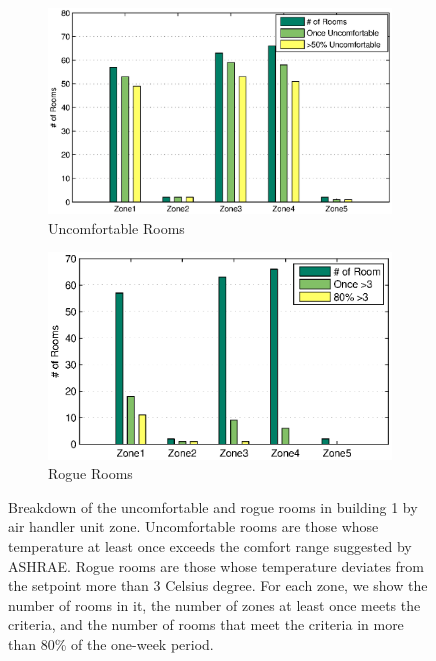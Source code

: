 \begin{figure}[h!]
\centering
	\begin{subfigure}{0.48\textwidth}
                \centering
		\includegraphics[width=\textwidth]{./figs/uncmft_soda.eps}
                \caption{Uncomfortable Rooms}
                \label{fig:soda_zone1}
	\end{subfigure}
	\begin{subfigure}{0.48\textwidth}
                \centering
		\includegraphics[width=\textwidth]{./figs/rogue_soda.eps}
                \caption{Rogue Rooms}
                \label{fig:soda_zone2}

	\end{subfigure}
\caption{Breakdown of the uncomfortable and rogue rooms in building 1 by air handler unit zone. Uncomfortable rooms are those whose temperature at least once exceeds the comfort range suggested by ASHRAE. Rogue rooms are those whose temperature deviates from the setpoint more than 3 Celsius degree. For each zone, we show the number of rooms in it, the number of zones at least once meets the criteria, and the number of rooms that meet the criteria in more than 80\% of the one-week period.} 
\end{figure}

